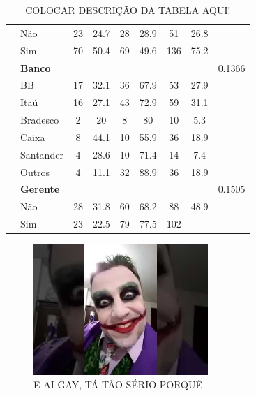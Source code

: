 \documentclass[]{article}
\begin{document}
\begin{table}[t]
\begin{tabular}{c c c c c c c c c}
                \multicolumn{1}{c}{}    &
                \multicolumn{1}{l}{Não} & 23 & 24.7 & 28 & 28.9 & 51 & 26.8 &  \\
                \multicolumn{1}{c}{}    &
                \multicolumn{1}{l}{Sim}& 70 & 50.4 & 69 & 49.6 & 136 & 75.2  \\ \cmidrule{1-9} &
                \multicolumn{1}{l}{\textbf{Banco}}&  &  &  & & &  & 0.1366\\ \cmidrule{1-9}                
                \multicolumn{1}{c}{}    &
                \multicolumn{1}{l}{BB} & 17 & 32.1 & 36 & 67.9 & 53 & 27.9  \\
                \multicolumn{1}{c}{}    &   
                \multicolumn{1}{l}{Itaú} &16 & 27.1 & 43 & 72.9 & 59 & 31.1  \\
                \multicolumn{1}{c}{}    &
                \multicolumn{1}{l}{Bradesco} & 2 & 20 & 8 & 80 & 10 & 5.3 \\
                \multicolumn{1}{c}{}    &
                \multicolumn{1}{l}{Caixa} & 8 & 44.1 & 10 & 55.9 & 36 & 18.9  \\
                \multicolumn{1}{c}{}    &
                \multicolumn{1}{l}{Santander} & 4 & 28.6 & 10 & 71.4 & 14 & 7.4  \\
                \multicolumn{1}{c}{}    &
                \multicolumn{1}{l}{Outros} & 4 & 11.1 & 32 & 88.9  & 36 & 18.9\\ \cmidrule{1-9} &
                \multicolumn{1}{l}{\textbf{Gerente}} &   &  &  & & &  & 0.1505 \\ \cmidrule{1-9}
                \multicolumn{1}{c}{}    &
                \multicolumn{1}{l}{Não} & 28 & 31.8 & 60 & 68.2 & 88 & 48.9 &  \\
                \multicolumn{1}{c}{}    &
                \multicolumn{1}{l}{Sim}& 23 & 22.5 & 79 & 77.5 & 102  \\
                \midrule
                \bottomrule
        \end{tabular}
        \centering
        \caption{COLOCAR DESCRIÇÃO DA TABELA AQUI!}
        \label{tab:sam_count}
\end{table}

\begin{figure}
\centering
\includegraphics[width=2.60417in]{hqdefault.jpg}
\caption{E AI GAY, TÁ TÃO SÉRIO PORQUÊ}
\end{figure}
\end{document}
